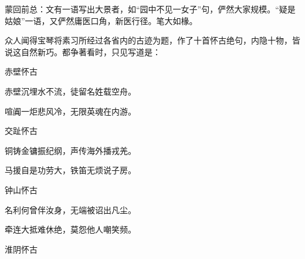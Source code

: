 

\begin{parag}
    \begin{note}蒙回前总：文有一语写出大景者，如“园中不见一女子”句，俨然大家规模。“疑是姑娘”一语，又俨然庸医口角，新医行径。笔大如椽。\end{note}
\end{parag}


\begin{parag}
    众人闻得宝琴将素习所经过各省内的古迹为题，作了十首怀古绝句，内隐十物，皆说这自然新巧。都争著看时，只见写道是：
\end{parag}


\begin{poem}
    \begin{pl}赤壁怀古　\end{pl}

    \begin{pl}赤壁沉埋水不流，徒留名姓载空舟。\end{pl}

    \begin{pl}喧阗一炬悲风冷，无限英魂在内游。\end{pl}

    \emptypl

    \begin{pl}交趾怀古　\end{pl}

    \begin{pl}铜铸金镛振纪纲，声传海外播戎羌。\end{pl}

    \begin{pl}马援自是功劳大，铁笛无烦说子房。\end{pl}

    \emptypl

    \begin{pl}钟山怀古　\end{pl}

    \begin{pl}名利何曾伴汝身，无端被诏出凡尘。\end{pl}

    \begin{pl}牵连大抵难休绝，莫怨他人嘲笑频。\end{pl}

    \emptypl
    \begin{pl}淮阴怀古　\end{pl}


\end{poem}
